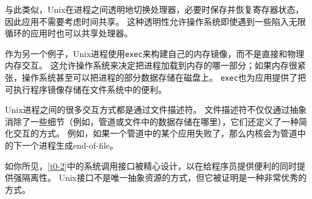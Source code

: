 与此类似，Unix在进程之间透明地切换处理器，必要时保存并恢复寄存器状态，因此应用不需要考虑时间共享。
这种透明性允许操作系统即使遇到一些陷入无限循环的应用时也可以共享处理器。

作为另一个例子，Unix进程使用\texttt{exec}来构建自己的内存镜像，而不是直接和物理内存交互。
这允许操作系统来决定把进程加载到内存的哪一部分；如果内存很紧张，操作系统甚至可以把进程的部分数据存储在磁盘上。
\texttt{exec}也为应用提供了把可执行程序镜像存储在文件系统中的便利。

Unix进程之间的很多交互方式都是通过文件描述符。
文件描述符不仅仅通过抽象消除了一些细节（例如，管道或文件中的数据存储在哪里），它们还定义了一种简化交互的方式。
例如，如果一个管道中的某个应用失败了，那么内核会为管道中的下一个进程生成end-of-file。

如你所见，\autoref{t0-2}中的系统调用接口被精心设计，以在给程序员提供便利的同时提供强隔离性。
Unix接口不是唯一抽象资源的方式，但它被证明是一种非常优秀的方式。

